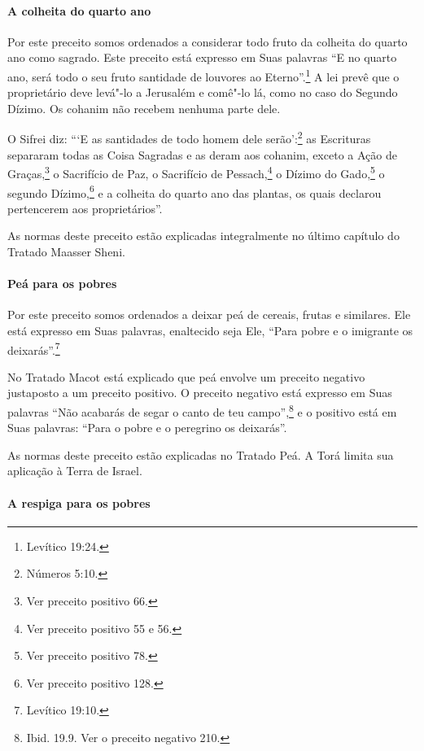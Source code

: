 \begin{multicols}{2}
\paragraph{A colheita do quarto ano}

Por este preceito somos ordenados a considerar todo fruto da colheita
do quarto ano como sagrado. Este preceito está expresso em Suas
palavras ``E no quarto ano, será todo o seu fruto santidade de louvores
ao Eterno''.\footnote{Levítico 19:24.} A lei prevê que o proprietário deve
levá"-lo a Jerusalém e comê"-lo lá, como no caso do Segundo Dízimo. Os
cohanim\starr{} não recebem nenhuma parte dele.

O Sifrei\starr{} diz: ```E as santidades de todo homem dele serão':\footnote{Números 5:10.} as Escrituras separaram todas as Coisa Sagradas e as deram
aos cohanim\starr, exceto a Ação de Graças,\footnote{Ver preceito positivo 66.} o Sacrifício de Paz, o Sacrifício de Pessach\starr,\footnote{Ver preceito positivo 55 e 56.} o Dízimo do Gado,\footnote{Ver preceito positivo 78.} o segundo Dízimo,\footnote{Ver preceito positivo 128.} e a colheita do quarto ano
das plantas, os quais declarou pertencerem aos proprietários''.

As normas deste preceito estão explicadas integralmente no último
capítulo do Tratado Maasser Sheni\starr.


\paragraph{Peá\starr{} para os pobres}

Por este preceito somos ordenados a deixar peá\starr{}
de cereais, frutas e similares. Ele está expresso em Suas palavras,
enaltecido seja Ele, ``Para pobre e o imigrante os deixarás''.\footnote{Levítico 19:10.}

No Tratado Macot\starr{} está explicado que peá\starr{} envolve um preceito negativo
justaposto a um preceito positivo. O preceito negativo está expresso
em Suas palavras ``Não acabarás de segar o canto de teu campo'',\footnote{Ibid.
19.9. Ver o preceito negativo 210.} e o positivo está em Suas palavras: ``Para o pobre e o peregrino os
deixarás''.

As normas deste preceito estão explicadas no Tratado Peá\starr. A Torá\starr{} limita
sua aplicação à Terra de Israel.

\paragraph{A respiga para os pobres}


\end{multicols}
